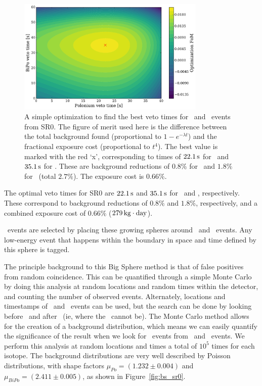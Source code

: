 \begin{figure}[htb]
    \centering
    \includegraphics[width=0.8\textwidth]{figures/rnveto/sr0_veto_time_optimization}
    \caption{A simple optimization to find the best veto times for \Po~and \BiPo~events from SR0. The figure of merit used here is the difference between the total background found (proportional to $1-e^{-\lambda t}$) and the fractional exposure cost (proportional to $t^4$). The best value is marked with the red `x', corresponding to times of $22.1\,\mathrm{s}$ for \Po~and $35.1\,\mathrm{s}$ for \BiPo. These are background reductions of $0.8\%$ for \Po~and $1.8\%$ for \BiPo~(total $2.7\%$). The exposure cost is $0.66\%$.}\label{fig:veto_time_optimization}
\end{figure}

The optimal veto times for SR0 are $22.1\,\mathrm{s}$ and $35.1\,\mathrm{s}$ for \Po~and \BiPo, respectively. These correspond to background reductions of $0.8\%$ and $1.8\%$, respectively, and a combined exposure cost of $0.66\%$ ($279\,\mathrm{kg\cdot day}$).

\Pb~events are selected by placing these growing spheres around \Po~and \BiPo~events. Any low-energy event that happens within the boundary in space and time defined by this sphere is tagged.

The principle background to this Big Sphere method is that of false positives from random coincidence. This can be quantified through a simple Monte Carlo by doing this analysis at random locations and random times within the detector, and counting the number of observed events. Alternately, locations and timestamps of \Po~and \BiPo~events can be used, but the search can be done by looking before \Po~and after \BiPo~(ie, where the \Pb~cannot be). The Monte Carlo method allows for the creation of a background distribution, which means we can easily quantify the significance of the result when we look for \Pb~events from \Po~and \BiPo~events. We perform this analysis at random locations and times a total of $10^{5}$ times for each isotope. The background distributions are very well described by Poisson distributions, with shape factors $\mu_{Po} = (1.232 \pm 0.004)$ and $\mu_{BiPo} = (2.411 \pm 0.005)$, as shown in Figure~\ref{fig:bs_sr0}.

